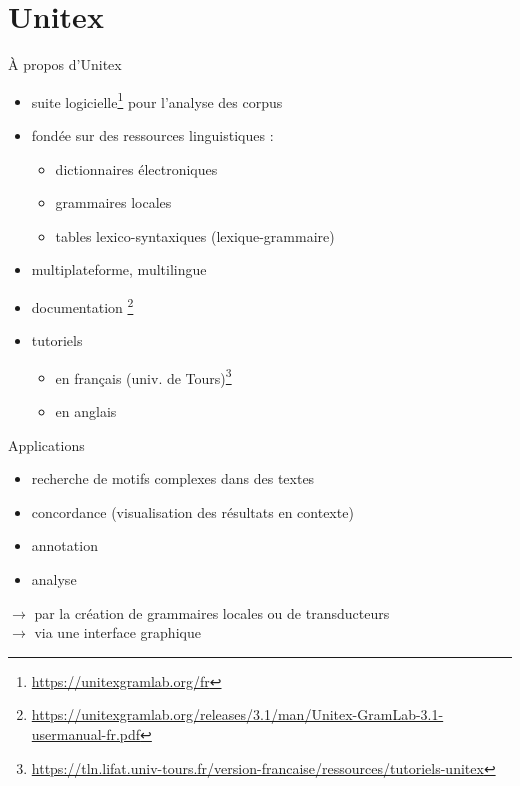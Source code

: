 \documentclass[xetex,xcolor={table,usenames,dvipsnames}]{beamer}
\begin{document}
\section{Unitex}
\begin{frame}{À propos d'Unitex}
	\begin{itemize}
		\item suite logicielle\footnote{\url{https://unitexgramlab.org/fr}} pour l'analyse des corpus 
		\item fondée sur des ressources linguistiques :
		\begin{itemize}
			\item dictionnaires électroniques
			\item grammaires locales
			\item tables lexico-syntaxiques (lexique-grammaire)
		\end{itemize}
		\item multiplateforme, multilingue
		\item documentation \citep{paumier2021unitex}\footnote{\url{https://unitexgramlab.org/releases/3.1/man/Unitex-GramLab-3.1-usermanual-fr.pdf}}
		\item tutoriels 
		\begin{itemize}
			\item en français (univ. de Tours)\footnote{\url{https://tln.lifat.univ-tours.fr/version-francaise/ressources/tutoriels-unitex}}
			\item en anglais \citep{krstev2022}
		\end{itemize}
	\end{itemize}
	
\end{frame}

\begin{frame}{Applications}
	\begin{itemize}
		\item recherche de motifs complexes dans des textes
		\item concordance (visualisation des résultats en contexte)
		\item annotation
		\item analyse
		\end{itemize}
	
		$\rightarrow$ par la création de grammaires locales ou de transducteurs \\
		$\rightarrow$ via une interface graphique
\end{frame}
\end{document}
